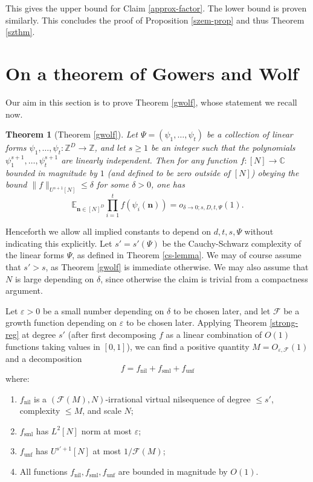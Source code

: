 \documentclass[11pt,reqno]{amsart}
\numberwithin{equation}{section}
\theoremstyle{plain}
\newtheorem{theorem}[subsection]{Theorem}
\theoremstyle{definition}
\renewcommand{\leq}{\leqslant}
\renewcommand{\geq}{\geqslant}
\newcommand\E{{\mathbb{E}}}
\newcommand\Z{\mathbb{Z}}
\newcommand\C{\mathbb{C}}
\newcommand\1{{\bf 1}}
\newcommand\2{{\bf 2}}
\newcommand\eps{\varepsilon}
\newcommand\nil{{\operatorname{nil}}}
\newcommand\sml{{\operatorname{sml}}}
\newcommand\unf{{\operatorname{unf}}}
\newcommand\Grow{{\mathcal F}}
\begin{document}
This gives the upper bound for Claim \ref{approx-factor}.  The lower bound is proven similarly.  This concludes the proof of Proposition \ref{szem-prop} and thus Theorem \ref{szthm}.

\section{On a theorem of Gowers and Wolf}\label{gowers-wolf-sec}

Our aim in this section is to prove Theorem \ref{gwolf}, whose statement we recall now. 

\begin{theorem}[Theorem \ref{gwolf}]  Let $\Psi = (\psi_1,\ldots,\psi_t)$ be a collection of linear forms $\psi_1,\ldots,\psi_t: \Z^D \to \Z$, and let $s \geq 1$ be an integer such that the polynomials $\psi_1^{s+1},\ldots,\psi_t^{s+1}$ are linearly independent.  Then for any function $f: [N] \to \C$ bounded in magnitude by $1$ \textup{(}and defined to be zero outside of $[N]$\textup{)} obeying the bound $\|f\|_{U^{s+1}[N]} \leq \delta$ for some $\delta > 0$, one has
$$ \E_{\mathbf{n}  \in [N]^D} \prod_{i=1}^t f( \psi_i(\mathbf{n}) ) = o_{\delta \to 0; s, D,t,\Psi}(1).$$
\end{theorem}

Henceforth we allow all implied constants to depend on $d,t,s,\Psi$ without indicating this explicitly. Let $s' = s'(\Psi)$ be the Cauchy-Schwarz complexity of the linear forms $\Psi$, as defined in Theorem \ref{cs-lemma}. We may of course assume that $s'>s$, as Theorem \ref{gwolf} is immediate otherwise. We may also assume that $N$ is large depending on $\delta$, since otherwise the claim is trivial from a compactness argument.

Let $\eps > 0$ be a small number depending on $\delta$ to be chosen later, and let $\Grow$ be a growth function depending on $\eps$ to be chosen later.  Applying  Theorem \ref{strong-reg} at degree $s'$ (after first decomposing $f$ as a linear combination of $O(1)$ functions taking values in $[0,1]$), we can find a positive quantity $M = O_{\eps,\Grow}(1)$ and a decomposition
\begin{equation}\label{fdecomp}
f = f_\nil + f_\sml + f_\unf
\end{equation}
where:
\begin{enumerate}
\item $f_\nil$ is a $(\Grow(M),N)$-irrational virtual nilsequence of degree $\leq s'$, complexity $\leq M$, and scale $N$;
\item $f_\sml$ has $L^2[N]$ norm at most $\eps$;
\item $f_\unf$ has $U^{s'+1}[N]$ at most $1/\Grow(M)$;
\item All functions $f_\nil, f_\sml, f_\unf$ are bounded in magnitude by $O(1)$.
\end{enumerate}
\end{document}
